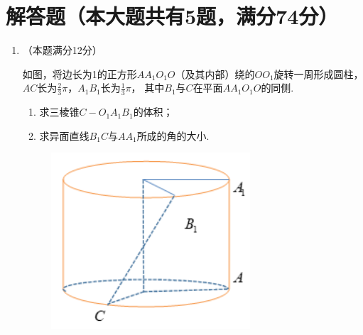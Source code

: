 \documentclass[12pt,space]{ctexart} %
\begin{document}
\section{解答题（本大题共有5题，满分74分）}
\begin{enumerate}[itemsep=-0.3em,topsep=0pt, resume]

  \item （本题满分12分）\\[0.5em] 
    \begin{minipage}[h][18ex][t]{.63\textwidth}
      如图，将边长为1的正方形$AA_1O_1O$（及其内部）绕的$OO_1$旋转一周形成圆柱，$AC$长为$\displaystyle{\frac 23\pi}$，$A_1B_1$长为$\displaystyle{\frac 13\pi}$，
      其中$B_1$与$C$在平面$AA_1O_1O$的同侧. 
      \begin{enumerate}[itemsep=-0.3em,label={(\arabic*)},topsep=0pt,labelsep=.5em,leftmargin=1.7em]
        \item 求三棱锥$C-O_1A_1B_1$的体积；
        \item 求异面直线$B_1C$与$AA_1$所成的角的大小. 
      \end{enumerate}
    \end{minipage}
    \begin{minipage}[h][18ex][b]{.35\textwidth}
      \begin{figure}[H]
        \centering
        \includegraphics[width=0.7\textwidth]{Image/sh-19.png}
      \end{figure}
    \end{minipage}


\end{enumerate}
\end{document}
